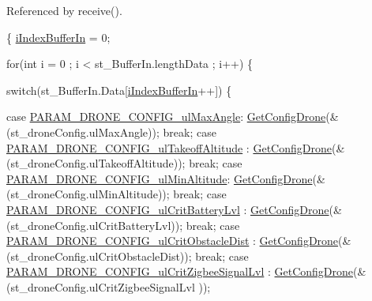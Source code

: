 Referenced by receive().


\begin{DoxyCode}
\{
    \hyperlink{classZigBee_a2b6ec705974d8db622f3eb00efeb9ad8}{iIndexBufferIn} = 0;

    \textcolor{keywordflow}{for}(\textcolor{keywordtype}{int} i = 0 ; i < st\_BufferIn.lengthData ; i++) \{

        \textcolor{keywordflow}{switch}(st\_BufferIn.Data[\hyperlink{classZigBee_a2b6ec705974d8db622f3eb00efeb9ad8}{iIndexBufferIn}++]) \{

        \textcolor{keywordflow}{case} \hyperlink{typdefUart_8h_a7fdf1e7bfbebe0c7a2eb84a10e069632a7828400a62571bb441a0216f1c2e29be}{PARAM\_DRONE\_CONFIG\_ulMaxAngle}:
            \hyperlink{classZigBee_a1817781f9b8e805bdd4eba25498714fe}{GetConfigDrone}(&(st\_droneConfig.ulMaxAngle));
            \textcolor{keywordflow}{break};
        \textcolor{keywordflow}{case} \hyperlink{typdefUart_8h_a7fdf1e7bfbebe0c7a2eb84a10e069632af954ea9792a880b2593da24e0214708f}{PARAM\_DRONE\_CONFIG\_ulTakeoffAltitude}
      :
            \hyperlink{classZigBee_a1817781f9b8e805bdd4eba25498714fe}{GetConfigDrone}(&(st\_droneConfig.ulTakeoffAltitude));
            \textcolor{keywordflow}{break};
        \textcolor{keywordflow}{case} \hyperlink{typdefUart_8h_a7fdf1e7bfbebe0c7a2eb84a10e069632a516ded0a007275ce22b40cba97734484}{PARAM\_DRONE\_CONFIG\_ulMinAltitude}:
            \hyperlink{classZigBee_a1817781f9b8e805bdd4eba25498714fe}{GetConfigDrone}(&(st\_droneConfig.ulMinAltitude));
            \textcolor{keywordflow}{break};
        \textcolor{keywordflow}{case} \hyperlink{typdefUart_8h_a7fdf1e7bfbebe0c7a2eb84a10e069632a212c640074147bd9d0d63888d538d256}{PARAM\_DRONE\_CONFIG\_ulCritBatteryLvl}
      :
            \hyperlink{classZigBee_a1817781f9b8e805bdd4eba25498714fe}{GetConfigDrone}(&(st\_droneConfig.ulCritBatteryLvl));
            \textcolor{keywordflow}{break};
        \textcolor{keywordflow}{case} \hyperlink{typdefUart_8h_a7fdf1e7bfbebe0c7a2eb84a10e069632adc16eed85f98b926f829decb1e7f3175}{PARAM\_DRONE\_CONFIG\_ulCritObstacleDist}
      :
            \hyperlink{classZigBee_a1817781f9b8e805bdd4eba25498714fe}{GetConfigDrone}(&(st\_droneConfig.ulCritObstacleDist));
            \textcolor{keywordflow}{break};
        \textcolor{keywordflow}{case} \hyperlink{typdefUart_8h_a7fdf1e7bfbebe0c7a2eb84a10e069632a91adcfa9ba7373cb5e94cb7dad749286}{PARAM\_DRONE\_CONFIG\_ulCritZigbeeSignalLvl}
      :
            \hyperlink{classZigBee_a1817781f9b8e805bdd4eba25498714fe}{GetConfigDrone}(&(st\_droneConfig.ulCritZigbeeSignalLvl
      ));

\end{DoxyCode}
